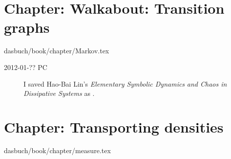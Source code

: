 \section{Chapter: Walkabout: Transition graphs}
\label{c-Markov}\noindent dasbuch/book/chapter/Markov.tex
\begin{description}
\item[2012-01-?? PC]
I saved Hao-Bai Lin's
{{\em Elementary Symbolic Dynamics}} {\em and Chaos in Dissipative Systems}
as .
\end{description}

%

\section{Chapter: Transporting densities}
\label{c-measure}\noindent dasbuch/book/chapter/measure.tex

